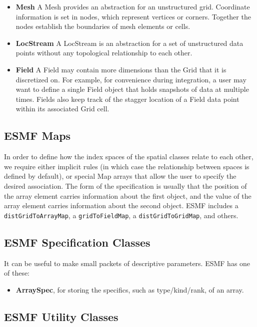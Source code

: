 \begin{itemize}
\item {\bf Mesh}  A Mesh provides an abstraction for an unstructured 
grid.  Coordinate information is set in nodes, which represent
vertices or corners.  Together the nodes establish the boundaries
of mesh elements or cells.

\item {\bf LocStream}  A LocStream is an abstraction for a set of 
unstructured data points without any topological relationship to each 
other.

\item {\bf Field}  A Field may contain more dimensions than the 
Grid that it is discretized on.  For example, for convenience 
during integration, a user may want to define a single Field object 
that holds snapshots of data at multiple times.  Fields also 
keep track of the stagger location of a Field data point within its 
associated Grid cell.

\end{itemize}

\subsection{ESMF Maps}

In order to define how the index spaces of the spatial classes relate
to each other, we require either implicit rules (in which case the
relationship between spaces is defined by default), or special Map arrays
that allow the user to specify the desired association.  The form of the 
specification is usually that the position of the array element carries
information about the first object, and the value of the array element carries
information about the second object.  ESMF includes a {\tt distGridToArrayMap},
a {\tt gridToFieldMap}, a {\tt distGridToGridMap}, and others.

\subsection{ESMF Specification Classes}

It can be useful to make small packets
of descriptive parameters.  ESMF has one of these:
\begin{itemize}
\item {\bf ArraySpec}, for storing the specifics, such as type/kind/rank,
of an array.
\end{itemize}

\subsection{ESMF Utility Classes}

